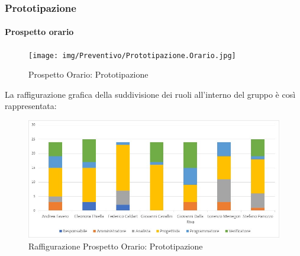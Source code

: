 \subsubsection{Prototipazione}
\paragraph{Prospetto orario}
\begin{figure}[h!]
	\centerline{\texttt{[image: img/Preventivo/Prototipazione.Orario.jpg]}}
	\caption{Prospetto Orario: Prototipazione}
\end{figure}
La raffigurazione grafica della suddivisione dei ruoli all'interno del gruppo è così rappresentata: 
\begin{figure}[h!]
	\centerline{\includegraphics[scale=0.4]{img/Preventivo/Istogrammi/Prototipazione.jpg}}
	\caption{Raffigurazione Prospetto Orario: Prototipazione}
\end{figure}
